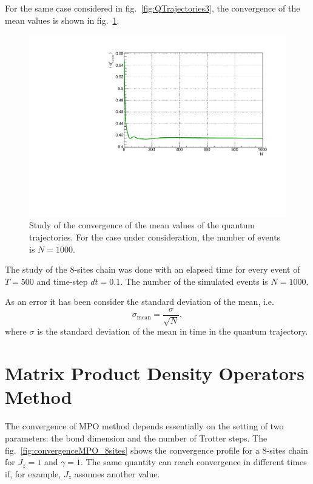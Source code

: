 For the same case considered in fig.~\ref{fig:QTrajectories3}, the convergence of the mean values is shown in fig.~\ref{fig:Convergence_s8J1051}. 

\begin{figure}[H]
    \centering
    \includegraphics[scale=0.7]{Figures/Convergence_s8J1051.pdf}
    \captionsetup{width=1.\linewidth}
    \caption{Study of the convergence of the mean values of the quantum trajectories. For the case under consideration, the number of events is $N = 1000$.}
    \label{fig:Convergence_s8J1051}
\end{figure}

The study of the 8-sites chain was done with an elapsed time for every event of $T = 500$ and time-step $dt = 0.1$. The number of the simulated events is $N = 1000$.

As an error it has been consider the standard deviation of the mean, i.e.
\begin{equation*}
    \sigma_{\text{mean}} = \frac{\sigma}{\sqrt{N}},
\end{equation*}
where $\sigma$ is the standard deviation of the mean in time in the quantum trajectory.

\section{Matrix Product Density Operators Method}
The convergence of MPO method depends essentially on the setting of two parameters: the bond dimension and the number of Trotter steps. The fig.~\ref{fig:convergenceMPO_8sites} shows the convergence profile for a 8-sites chain for $J_z = 1$ and $\gamma = 1$. The same quantity can reach convergence in different times if, for example, $J_z$ assumes another value. 

